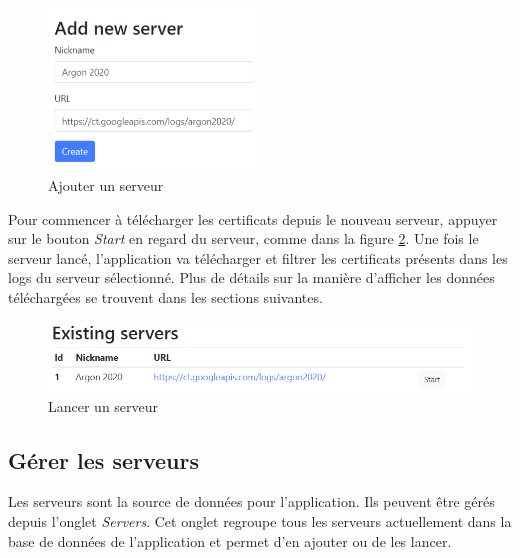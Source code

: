 \documentclass{article}
\begin{document}
\begin{figure}
\begin{center}
\includegraphics[width=0.5\textwidth]{img/add-srv.png} 
\end{center}
\caption{Ajouter un serveur}
\label{add-srv-fig}
\end{figure}

Pour commencer à télécharger les certificats depuis le nouveau serveur, appuyer sur le bouton \emph{Start} en regard du serveur, comme dans la figure \ref{start-srv-fig}.  Une fois le serveur lancé, l'application va télécharger et filtrer les certificats présents dans les logs du serveur sélectionné.  Plus de détails sur la manière d'afficher les données téléchargées se trouvent dans les sections suivantes.

\begin{figure}
\begin{center}
\includegraphics[width=\textwidth]{img/start-server.png} 
\end{center}
\caption{Lancer un serveur}
\label{start-srv-fig}
\end{figure}


\subsection{Gérer les serveurs}

Les serveurs sont la  source de données pour l'application.  Ils peuvent être gérés depuis l'onglet \emph{Servers}.  Cet onglet regroupe tous les serveurs actuellement dans la base de données de l'application et permet d'en ajouter ou de les lancer.
\end{document}
